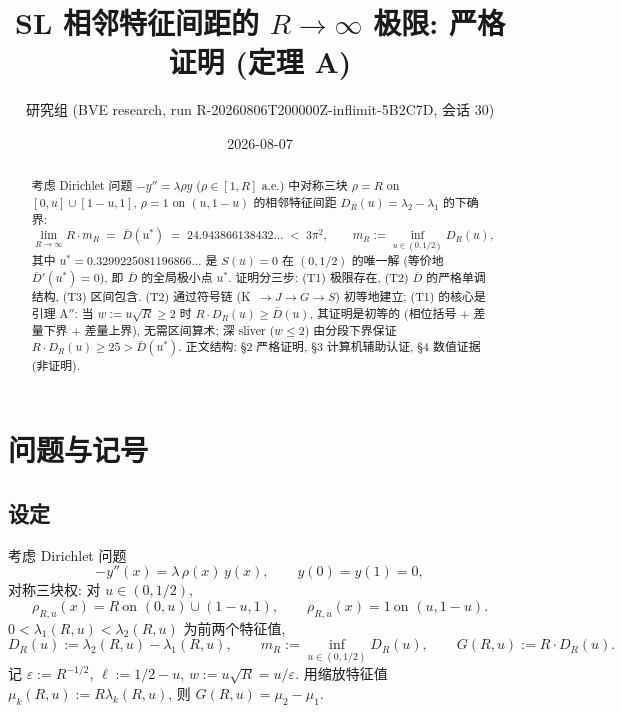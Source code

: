 \documentclass[UTF8]{ctexart}
\title{SL 相邻特征间距的 $R\to\infty$ 极限: 严格证明 (定理 A)}
\author{研究组 (BVE research, run R-20260806T200000Z-inflimit-5B2C7D, 会话 30)}
\date{2026-08-07}
\begin{document}
\maketitle

\begin{abstract}
考虑 Dirichlet 问题 $-y''=\lambda\rho y$ ($\rho\in[1,R]$ a.e.) 中对称三块
$\rho=R$ on $[0,u]\cup[1-u,1]$, $\rho=1$ on $(u,1-u)$ 的相邻特征间距
$D_R(u)=\lambda_2-\lambda_1$ 的下确界:
\begin{equation}
	\lim_{R\to\infty} R\cdot m_R \;=\; \bar D(u^*)\;=\; 24.943866138432\ldots
	\;<\; 3\pi^2,
	\qquad m_R:=\inf_{u\in(0,1/2)} D_R(u),
\end{equation}
其中 $u^*=0.3299225081196866\ldots$ 是 $S(u)=0$ 在 $(0,1/2)$ 的唯一解
(等价地 $\bar D'(u^*)=0$), 即 $\bar D$ 的全局极小点 $u^*$.
证明分三步: (T1) 极限存在, (T2) $\bar D$ 的严格单调结构, (T3) 区间包含.
(T2) 通过符号链 (K~$\to J\to G\to S$) 初等地建立;
(T1) 的核心是引理 A$''$: 当 $w:=u\sqrt R\ge 2$ 时 $R\cdot D_R(u)\ge\bar D(u)$,
其证明是初等的 (相位括号 + 差量下界 + 差量上界), 无需区间算术;
深 sliver ($w\le 2$) 由分段下界保证 $R\cdot D_R(u)\ge 25>\bar D(u^*)$.
正文结构: §2 严格证明, §3 计算机辅助认证, §4 数值证据 (非证明).
\end{abstract}

\tableofcontents

\section{问题与记号}

\subsection{设定}
考虑 Dirichlet 问题
\begin{equation}
	-y''(x)=\lambda\,\rho(x)\,y(x),\qquad y(0)=y(1)=0,
\end{equation}
对称三块权: 对 $u\in(0,1/2)$,
\begin{equation}
	\rho_{R,u}(x)=R\ \text{on }(0,u)\cup(1-u,1),\qquad
	\rho_{R,u}(x)=1\ \text{on }(u,1-u).
\end{equation}
$0<\lambda_1(R,u)<\lambda_2(R,u)$ 为前两个特征值,
\begin{equation}
	D_R(u):=\lambda_2(R,u)-\lambda_1(R,u),\qquad
	m_R:=\inf_{u\in(0,1/2)}D_R(u),\qquad
	G(R,u):=R\cdot D_R(u).
\end{equation}
记 $\varepsilon:=R^{-1/2}$, $\ell:=1/2-u$, $w:=u\sqrt R=u/\varepsilon$.
用缩放特征值 $\mu_k(R,u):=R\lambda_k(R,u)$, 则 $G(R,u)=\mu_2-\mu_1$.
\end{document}
